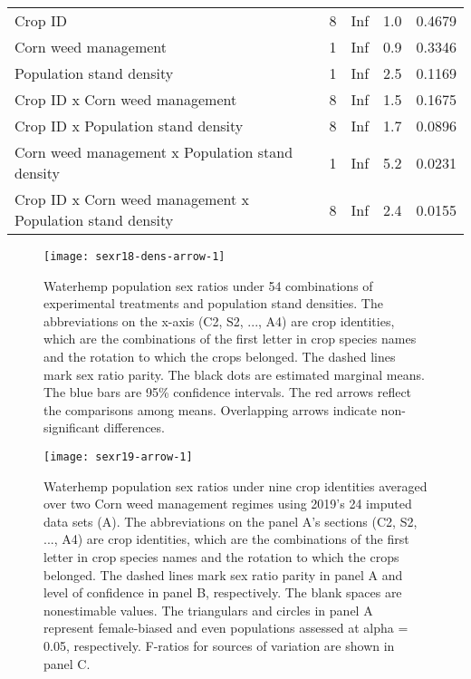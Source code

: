 \documentclass[
]{article}
\begin{document}
\begin{table}[H]
{\begin{tabular}[t]{lrrrl}
\hspace{1em}Crop ID & 8 & Inf & 1.0 & 0.4679\\
\hspace{1em}Corn weed management & 1 & Inf & 0.9 & 0.3346\\
\hspace{1em}Population stand density & 1 & Inf & 2.5 & 0.1169\\
\hspace{1em}Crop ID x Corn weed management & 8 & Inf & 1.5 & 0.1675\\
\hspace{1em}Crop ID x Population stand density & 8 & Inf & 1.7 & 0.0896\\
\hspace{1em}Corn weed management x Population stand density & 1 & Inf & 5.2 & 0.0231\\
\hspace{1em}Crop ID x Corn weed management x Population stand density & 8 & Inf & 2.4 & 0.0155\\
\bottomrule
\end{tabular}}
\end{table}

\begin{figure}
\texttt{[image: sexr18-dens-arrow-1]} \caption{Waterhemp population sex ratios under 54 combinations of experimental treatments and population stand densities. The abbreviations on the x-axis (C2, S2, ..., A4) are crop identities, which are the combinations of the first letter in crop species names and the rotation to which the crops belonged. The dashed lines mark sex ratio parity. The black dots are estimated marginal means. The blue bars are 95\% confidence intervals. The red arrows reflect the comparisons among means. Overlapping arrows indicate non-significant differences.}\label{fig:sexr18-dens-arrow}
\end{figure}

\begin{figure}
\texttt{[image: sexr19-arrow-1]} \caption{Waterhemp population sex ratios under nine crop identities averaged over two Corn weed management regimes using 2019's 24 imputed data sets (A). The abbreviations on the panel A's sections (C2, S2, ..., A4) are crop identities, which are the combinations of the first letter in crop species names and the rotation to which the crops belonged. The dashed lines mark sex ratio parity in panel A and level of confidence in panel B, respectively. The blank spaces are nonestimable values. The triangulars and circles in panel A represent female-biased and even populations assessed at alpha = 0.05, respectively. F-ratios for sources of variation are shown in panel C.}\label{fig:sexr19-arrow}
\end{figure}
\end{document}
